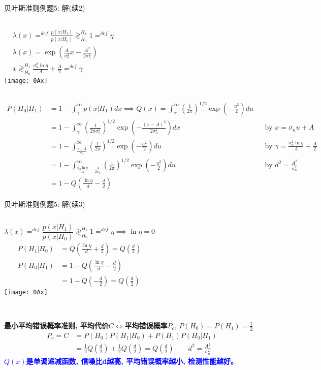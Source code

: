 \begin{frame}[shrink]{贝叶斯准则例题5: 解(续2)}
\begin{columns}
	\begin{align*}
	&\lambda(x)\mathop{=}^{def}\frac{p(x|H_1)}{p(x|H_0)}\mathop{\gtrless}_{H_0}^{H_1}1\mathop{=}^{def}\eta\\
	&\lambda(x)=\exp\left(\frac{A}{\sigma_n^2}x-\frac{A^2}{2\sigma_n^2}\right)\\
	&x\mathop{\gtrless}_{H_0}^{H_1}\frac{\sigma_n^2\ln\eta}{A}+\frac{A}{2}\mathop{=}^{def}\gamma
	\end{align*} 
	\texttt{[image: 0Ax]}
\end{columns}
\begin{align*}
P(H_0|H_1)&=1-\int_{\gamma}^{\infty}p(x|H_1)dx\implies Q(x)=\int_{x}^{\infty}\left(\frac{1}{2\pi}\right)^{1/2}\exp\left(-\frac{u^2}{2}\right)du\\
&=1-\int_{\gamma}^{\infty}\left(\frac{1}{2\pi\sigma_n^2}\right)^{1/2}\exp\left(-\frac{(x-A)^2}{2\sigma_n^2}\right)dx\qquad 
&&\text{by } x=\sigma_nu+A\\
&=1-\int_{\frac{\gamma-A}{\sigma_n}}^{\infty}\left(\frac{1}{2\pi}\right)^{1/2}\exp\left(-\frac{u^2}{2}\right)du\qquad &&\text{by } \gamma=\frac{\sigma_n^2\ln\eta}{A}+\frac{A}{2}\\
&=1-\int_{\frac{\sigma_n\ln\eta}{A}-\frac{A}{2\sigma_n}}^{\infty}\left(\frac{1}{2\pi}\right)^{1/2}\exp\left(-\frac{u^2}{2}\right)du\qquad &&\text{by } d^2=\frac{A^2}{\sigma_n^2}\\
&=1-Q\left(\frac{\ln\eta}{d}-\frac{d}{2}\right)
\end{align*}
\end{frame}

\begin{frame}[shrink]{贝叶斯准则例题5: 解(续3)}
\begin{columns}
	\[\lambda(x)\mathop{=}^{def}\frac{p(x|H_1)}{p(x|H_0)}\mathop{\gtrless}_{H_0}^{H_1}1\mathop{=}^{def}\eta\implies\ln\eta=0\]
	\begin{align*}
	P(H_1|H_0)&=Q\left(\frac{\ln\eta}{d}+\frac{d}{2}\right)=Q\left(\frac{d}{2}\right)\\
	P(H_0|H_1)&=1-Q\left(\frac{\ln\eta}{d}-\frac{d}{2}\right)\\
	&=1-Q\left(-\frac{d}{2}\right)=Q\left(\frac{d}{2}\right)
	\end{align*}
	\texttt{[image: 0Ax]}
\end{columns}
~\\
\textbf{最小平均错误概率准则, 平均代价$C$}$\Leftrightarrow$\textbf{平均错误概率$P_e$}, $P(H_0)=P(H_1)=\frac{1}{2}$
\begin{align*}
P_e=C&=P(H_0)P(H_1|H_0)+P(H_1)P(H_0|H_1)\\
&=\frac{1}{2}Q\left(\frac{d}{2}\right)+\frac{1}{2}Q\left(\frac{d}{2}\right)=Q\left(\frac{d}{2}\right)\qquad d^2=\frac{A^2}{\sigma_n^2}
\end{align*}
\textbf{\textcolor{blue}{$Q(x)$是单调递减函数, 信噪比d越高, 平均错误概率越小, 检测性能越好。
}}
\end{frame}

